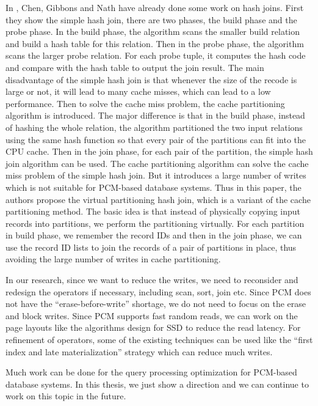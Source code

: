 In \cite{chen2011rethinking}, Chen, Gibbons and Nath have already done some work on hash joins. First they show the simple hash join, there are two phases, the build phase and the probe phase. In the build phase, the algorithm scans the smaller build relation and build a hash table for this relation. Then in the probe phase, the algorithm scans the larger probe relation. For each probe tuple, it computes the hash code and compare with the hash table to output the join result. The main disadvantage of the simple hash join is that whenever the size of the recode is large or not, it will lead to many cache misses, which can lead to a low performance. Then to solve the cache miss problem, the cache partitioning algorithm is introduced. The major difference is that in the build phase, instead of hashing the whole relation, the algorithm partitioned the two input relations using the same hash function so that every pair of the partitions can fit into the CPU cache. Then in the join phase, for each pair of the partition, the simple hash join algorithm can be used. The cache partitioning algorithm can solve the cache miss problem of the simple hash join. But it introduces a large number of writes which is not suitable for PCM-based database systems. Thus in this paper, the authors propose the virtual partitioning hash join, which is a variant of the cache partitioning method. The basic idea is that instead of physically copying input records into partitions, we perform the partitioning virtually. For each partition in build phase, we remember the record IDs and then in the join phase, we can use the record ID lists to join the records of a pair of partitions in place, thus avoiding the large number of writes in cache partitioning.

In our research, since we want to reduce the writes, we need to reconsider and redesign the operators if necessary, including scan, sort, join etc. Since PCM does not have the ``erase-before-write'' shortage, we do not need to focus on the erase and block writes. Since PCM supports fast random reads, we can work on the page layouts like the algorithms design for SSD to reduce the read latency. For refinement of operators, some of the existing techniques can be used like the ``first index and late materialization'' strategy which can reduce much writes.

Much work can be done for the query processing optimization for PCM-based database systems. In this thesis, we just show a direction and we can continue to work on this topic in the future.
